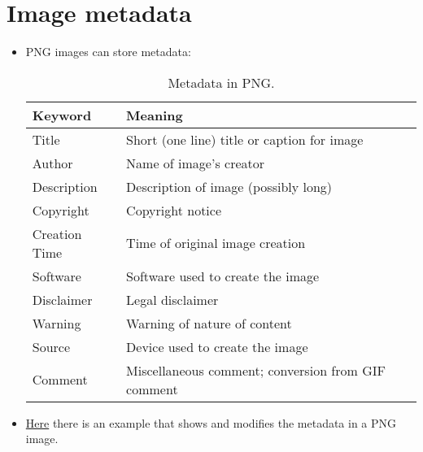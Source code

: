 \section{Image metadata}
\begin{itemize}
\item \gls{PNG} images can store metadata:
  \begin{table}
  \begin{center}
    \begin{tabular}{l|l}
      Keyword & Meaning\\
      \hline
      Title & Short (one line) title or caption for image \\
      Author & Name of image's creator \\
      Description & Description of image (possibly long) \\
      Copyright & Copyright notice \\
      Creation Time & Time of original image creation \\
      Software & Software used to create the image \\
      Disclaimer & Legal disclaimer \\
      Warning & Warning of nature of content \\
      Source & Device used to create the image \\
      Comment & Miscellaneous comment; conversion from GIF comment
    \end{tabular}
  \end{center}
  \caption{Metadata in PNG.}
  \label{tab:meta_PNG}
  \end{table}
\end{itemize}

\begin{itemize}
\item
  \href{https://github.com/vicente-gonzalez-ruiz/medical_imaging/blob/main/notebooks/PNG_add_metadata.ipynb}{Here}
  there is an example that shows and modifies the metadata in a PNG
  image.
\end{itemize}